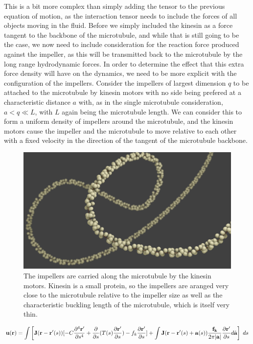 \documentclass[11pt]{ucthesis}
\def\br{{\bf r}}
\begin{document}
{This is a bit more complex than simply adding the tensor to the previous equation of motion, as the interaction tensor needs to include the forces of all objects moving in the fluid. 
Before we simply included the kinesin as a force tangent to the backbone of the microtubule, and while that is still going to be the case, we now need to include consideration for the reaction force produced against the impeller, as this will be transmitted back to the microtubule by the long range hydrodynamic forces.
In order to determine the effect that this extra force density will have on the dynamics, we need to be more explicit with the configuration of the impellers.
Consider the impellers of largest dimension $q$ to be attached to the microtubule by kinesin motors with no side being prefered at a characteristic distance $a$ with, as in the single microtubule consideration, $a < q \ll L$, with $L$ again being the microtubule length. 
We can consider this to form a uniform density of impellers around the microtubule, and the kinesin motors cause the impeller and the microtubule to move relative to each other with a fixed velocity in the direction of the tangent of the microtubule backbone. 
\begin{figure}[htp]
\begin{center}
\includegraphics[width=\hsize]{impeller.png}
\caption{ 
The impellers are carried along the microtubule by the kinesin motors. Kinesin is a small protein, so the impellers are aranged very close to the microtubule relative to the impeller size as well as the characteristic buckling length of the microtubule, which is itself very thin.
}
\label{fig:quadforce}
\end{center}
\end{figure}
\begin{equation}
\label{eq:fluidmodel}
 \mathbf{u}(\br) =  \int \left[ \mathbf{J}(\br-\br^\prime(s))[-C \frac{\partial^4 \br^\prime}{\partial s^4} + \frac{\partial}{\partial s}(T(s)\frac{\partial \br^\prime}{\partial s}) - f_k \frac{\partial \br^\prime}{\partial s}] + \int  \mathbf{J}(\br-\br^\prime(s)+ \mathbf{a}(s)) \frac{ \mathbf{f_k}}{2\pi| \mathbf{a}|} \frac{\partial \br^\prime}{\partial s} d \hat{ \mathbf{a}} \right] \;ds

\end{equation}}
\end{document}
